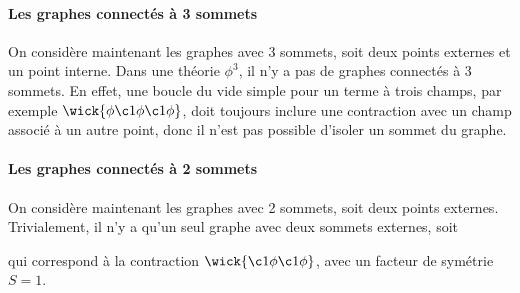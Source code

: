 \documentclass{article}
\numberwithin{equation}{section}
\theoremstyle{solution}
\begin{document}
\paragraph{Les graphes connectés à 3 sommets} On considère maintenant les graphes avec 3 sommets, soit deux points externes et un point interne. 
Dans une théorie $\phi^{3}$, il n'y a pas de graphes connectés à 3 sommets. En effet, une boucle du vide simple pour un terme à trois champs, par exemple $\wick{\phi \c1 \phi \c1 \phi}$, 
doit toujours inclure une contraction avec un champ associé à un autre point, donc il n'est pas possible d'isoler un sommet du graphe.


\paragraph{Les graphes connectés à 2 sommets} On considère maintenant les graphes avec 2 sommets, soit deux points externes. Trivialement, il n'y a qu'un seul graphe avec deux 
sommets externes, soit
\begin{figure}[H]
        \centering
{}
\end{figure}
\noindent
qui correspond à la contraction $\wick{\c1 \phi \c1 \phi}$, avec un facteur de symétrie $S = 1$.
\end{document}
